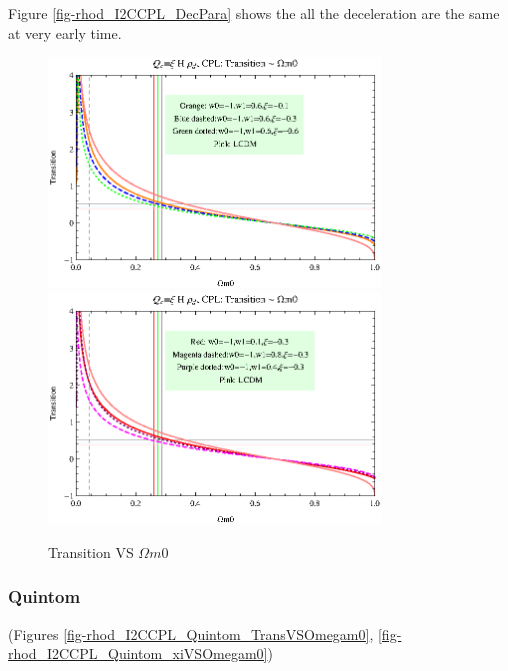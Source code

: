 \documentclass[12pt,a4paper]{article}
\begin{document}
Figure \ref{fig-rhod_I2CCPL_DecPara} shows the all the deceleration are the same at very early time. 




\begin{figure}
\centering
\includegraphics[width=250pt]{rhod_I2CCPL_TransVSOmegam01.eps}
\includegraphics[width=250pt]{rhod_I2CCPL_TransVSOmegam02.eps}
\caption{Transition VS $\Omega m0$}\label{fig-rhod_I2CCPL_TransVSOmegam0}
\end{figure}


\subsubsection{Quintom}

(Figures \ref{fig-rhod_I2CCPL_Quintom_TransVSOmegam0}, \ref{fig-rhod_I2CCPL_Quintom_xiVSOmegam0})
\end{document}
